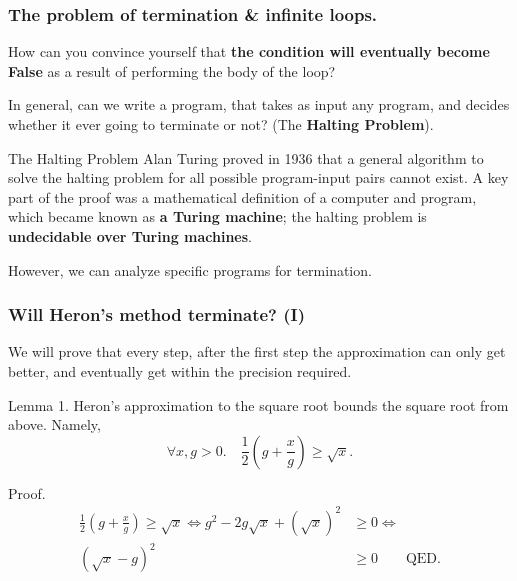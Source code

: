 \documentclass{beamer} %
\newcommand\emc[1]{\textcolor{brightblue}{\textbf{#1}}}
\begin{document}
\begin{frame}
\frametitle{The problem of termination \& infinite loops.}

How can you convince yourself that \emc{the condition will eventually become False} as a result of performing the body of the loop?

\vspace{5mm}
In general, can we write a program, that takes as input any program, and decides whether it ever going to terminate or not? (The \emc{Halting Problem}).

\begin{block}{The Halting Problem}
Alan Turing proved in 1936 that a general algorithm to solve the halting problem for all possible program-input pairs cannot exist. A key part of the proof was a mathematical definition of a computer and program, which became known as \emc{a Turing machine}; the halting problem is \emc{undecidable over Turing machines}. %
\end{block}

However, we can analyze specific programs for termination.

\end{frame}

\begin{frame}
\frametitle{Will Heron's method terminate? (I)}

We will prove that every step, after the first step the approximation can only get better, and eventually get within the precision required.

\vspace{3mm}
Lemma 1. Heron's approximation to the square root bounds the square root from above. Namely, 
\[\forall x,g > 0. \quad \frac{1}{2}(g + \frac{x}{g}) \geq \sqrt{x}.\]

Proof. 
\begin{align}
\frac{1}{2}(g + \frac{x}{g}) \geq \sqrt{x} \Leftrightarrow
g^2 - 2g\sqrt{x}+(\sqrt{x})^2 &\geq 0 \Leftrightarrow \\ 
(\sqrt{x} - g)^2 &\geq 0 \qquad \text{QED}.
\end{align}

\end{frame}
\end{document}
